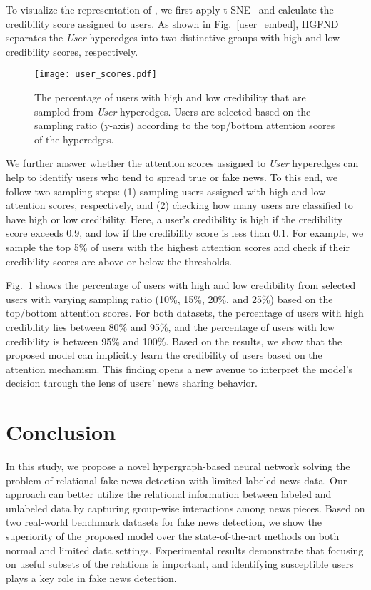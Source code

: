 \documentclass[conference]{IEEEtran}
\begin{document}
To visualize the representation of , we first apply t-SNE~\cite{pedregosa2011scikit} and calculate the credibility score assigned to users. As shown in Fig.~\ref{user_embed}, HGFND separates the \textit{User} hyperedges into two distinctive groups with high and low credibility scores, respectively.



\begin{figure}[H]
\centering
\texttt{[image: user\_scores.pdf]}
\caption{The percentage of users with high and low credibility that are sampled from \textit{User} hyperedges. Users are selected based on the sampling ratio (y-axis) according to the top/bottom attention scores of the hyperedges.}
\label{user_detect}
\end{figure}

We further answer whether the attention scores assigned to \textit{User} hyperedges can help to identify users who tend to spread true or fake news. To this end, we follow two sampling steps: (1) sampling users assigned with  high and low attention scores, respectively, and (2) checking how many users are classified to have high or low credibility. Here, a user's credibility is high if the credibility score exceeds 0.9, and low if the credibility score is less than 0.1. For example, we sample the top 5\% of users with the highest attention scores and check if their credibility scores are above or below the thresholds. 

Fig.~\ref{user_detect} shows the percentage of users with high and low credibility from selected users with varying sampling ratio (10\%, 15\%, 20\%, and 25\%) based on the top/bottom attention scores. For both datasets, the percentage of users with high credibility lies between 80\% and 95\%, and the percentage of users with low credibility is between 95\% and 100\%. Based on the results, we show that the proposed model can implicitly learn the credibility of users based on the attention mechanism. This finding opens a new avenue to interpret the model's decision through the lens of users' news sharing behavior.





\section{Conclusion}
In this study, we propose a novel hypergraph-based neural network solving the problem of relational fake news detection with limited labeled news data. Our approach can better utilize the relational information between labeled and unlabeled data by capturing group-wise interactions among news pieces. Based on two real-world benchmark datasets for fake news detection, we show the superiority of the proposed model over the state-of-the-art methods on both normal and limited data settings. Experimental results demonstrate that focusing on useful subsets of the relations is important, and identifying susceptible users plays a key role in fake news detection.
\end{document}
